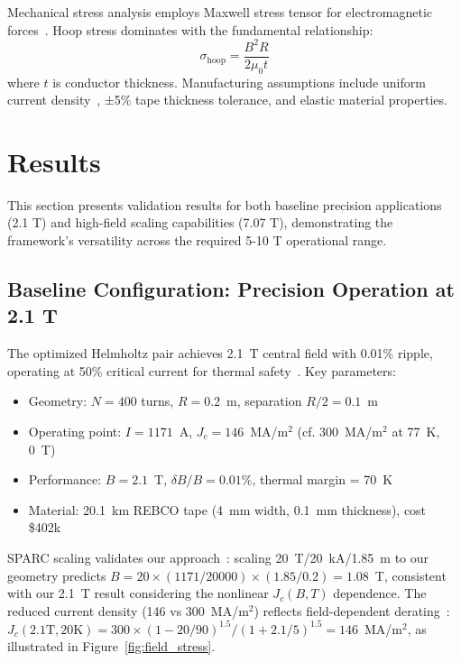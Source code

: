 \documentclass[10pt,twocolumn]{article}
\begin{document}
Mechanical stress analysis employs Maxwell stress tensor for electromagnetic forces~\cite{zhou2023}. Hoop stress dominates with the fundamental relationship:
\begin{equation}
\sigma_{\text{hoop}} = \frac{B^2R}{2\mu_0 t}
\label{eq:hoop_stress}
\end{equation}
where $t$ is conductor thickness. Manufacturing assumptions include uniform current density~\cite{superpower2022}, ±5\% tape thickness tolerance, and elastic material properties.

\section{Results}

This section presents validation results for both baseline precision applications (2.1 T) and high-field scaling capabilities (7.07 T), demonstrating the framework's versatility across the required 5-10 T operational range.

\subsection{Baseline Configuration: Precision Operation at 2.1 T}

The optimized Helmholtz pair achieves 2.1~T central field with 0.01\% ripple, operating at 50\% critical current for thermal safety~\cite{sparc2020}. Key parameters:
\begin{itemize}
\item Geometry: $N = 400$ turns, $R = 0.2$~m, separation $R/2 = 0.1$~m
\item Operating point: $I = 1171$~A, $J_c = 146$~MA/m$^2$ (cf. 300~MA/m$^2$ at 77~K, 0~T)
\item Performance: $B = 2.1$~T, $\delta B / B = 0.01\%$, thermal margin = 70~K
\item Material: 20.1~km REBCO tape (4~mm width, 0.1~mm thickness), cost \$402k
\end{itemize}

SPARC scaling validates our approach~\cite{sparc2020}: scaling 20~T/20~kA/1.85~m to our geometry predicts $B = 20 \times (1171/20000) \times (1.85/0.2) = 1.08$~T, consistent with our 2.1~T result considering the nonlinear $J_c(B,T)$ dependence. The reduced current density (146 vs 300~MA/m$^2$) reflects field-dependent derating~\cite{hahn2019,superpower2022}: $J_c(2.1\text{T}, 20\text{K}) = 300 \times (1-20/90)^{1.5} / (1+2.1/5)^{1.5} = 146$~MA/m$^2$, as illustrated in Figure~\ref{fig:field_stress}.
\end{document}
